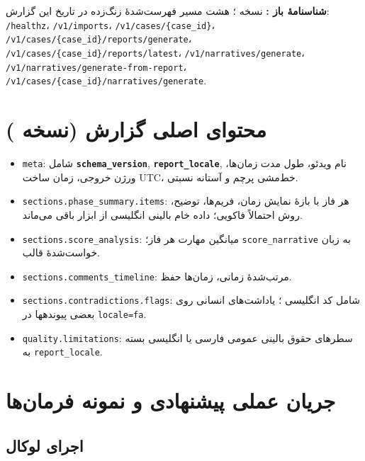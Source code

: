 \documentclass[12pt,a4paper]{article}
\begin{document}
\noindent
\textbf{شناسنامهٔ باز :} نسخه ؛ هشت مسیر فهرست‌شدهٔ زنگ‌زده در تاریخ این گزارش:\\
\texttt{/healthz}،
\texttt{/v1/imports}،
\texttt{/v1/cases/\{case\_id\}}،
\texttt{/v1/cases/\{case\_id\}/reports/generate}،
\texttt{/v1/cases/\{case\_id\}/reports/latest}،
\texttt{/v1/narratives/generate}،
\texttt{/v1/narratives/generate-from-report}،
\texttt{/v1/cases/\{case\_id\}/narratives/generate}.

\section{محتوای اصلی  گزارش (نسخه )}
\begin{itemize}
  \item \texttt{meta}: شامل \textbf{\texttt{schema\_version}}, \textbf{\texttt{report\_locale}}, نام ویدئو، طول مدت زمان‌ها، ورژن خروجی، زمان ساخت UTC، خط‌مشی پرچم و آستانه نسبتی.
  \item \texttt{sections.phase\_summary.items}: هر فاز با بازهٔ نمایش زمان، فریم‌ها، توضیح، روش احتمالاً فاکویی؛ داده خام بالینی انگلیسی از ابزار باقی می‌ماند.
  \item \texttt{sections.score\_analysis}: میانگین مهارت هر فاز؛ \texttt{score\_narrative} به زبان خواست‌شدهٔ قالب.
  \item \texttt{sections.comments\_timeline}: مرتب‌شدهٔ زمانی، زمان‌ها حفظ.
  \item \texttt{sections.contradictions.flags}: شامل کد انگلیسی ؛ یاداشت‌های انسانی روی بعضی پیوندهها در \texttt{locale=fa}.
  \item \texttt{quality.limitations}: سطرهای حقوق بالینی عمومی فارسی یا انگلیسی بسته به \texttt{report\_locale}.
\end{itemize}

\section{جریان عملی پیشنهادی و نمونه فرمان‌ها}
\subsection{اجرای لوکال}
\begin{tcolorbox}[colframe=mainblue,colback=white,breakable,title=\lr{PowerShell}]
\noindent{}\\
\noindent{}\\
\noindent{}\\
\noindent{}\\
\noindent{}
\end{tcolorbox}
\end{document}
